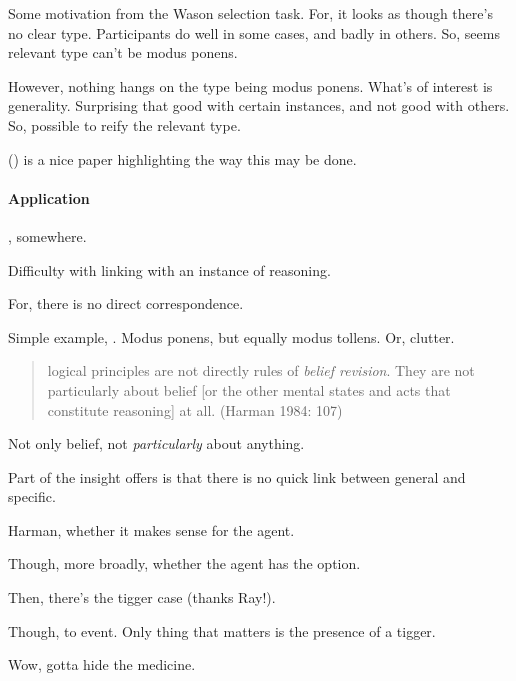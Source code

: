 \begin{note}
  Some motivation from the Wason selection task.
  For, it looks as though there's no clear type.
  Participants do well in some cases, and badly in others.
  So, seems relevant type can't be modus ponens.

  However, nothing hangs on the type being modus ponens.
  What's of interest is generality.
  Surprising that good with certain instances, and not good with others.
  So, possible to reify the relevant type.

  (\cite{Fodor:2000aa}) is a nice paper highlighting the way this may be done.
\end{note}

\paragraph{Application}

{
  \cite{Wilson:1994aa}, somewhere.
}

\begin{note}
  Difficulty with linking \tor{} with an instance of reasoning.

  For, there is no direct correspondence.

  Simple example, \citeauthor{Harman:1986ux}.
  Modus ponens, but equally modus tollens.
  Or, clutter.

  \begin{quote}
    logical principles are not directly rules of \emph{belief revision}.
    They are not particularly about belief [or the other mental states and acts that constitute reasoning] at all. (Harman 1984: 107)
  \end{quote}
  Not only belief, not \emph{particularly} about anything.

  Part of the insight \citeauthor{Harman:1986ux} offers is that there is no quick link between general and specific.
\end{note}

\begin{note}
  Harman, whether it makes sense for the agent.

  Though, more broadly, whether the agent has the option.

  Then, there's the tigger case (thanks Ray!).

  Though, to event.
  Only thing that matters is the presence of a tigger.

  Wow, gotta hide the medicine.
\end{note}

